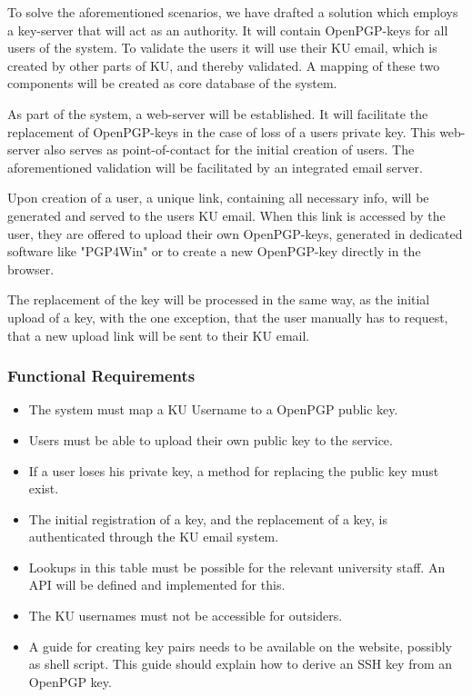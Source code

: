 \documentclass[11pt,a4paper]{report}
\begin{document}
To solve the aforementioned scenarios, we have drafted a solution which employs a key-server that will act as an authority. It will contain OpenPGP-keys for all users of the system. To validate the users it will use their KU email, which is created by other parts of KU, and thereby validated. A mapping of these two components will be created as core database of the system.

As part of the system, a web-server will be established. It will facilitate the replacement of OpenPGP-keys in the case of loss of a users private key. This web-server also serves as point-of-contact for the initial creation of users. The aforementioned validation will be facilitated by an integrated email server.

Upon creation of a user, a unique link, containing all necessary info, will be generated and served to the users KU email. When this link is accessed by the user, they are offered to upload their own OpenPGP-keys, generated in dedicated software like "PGP4Win" or to create a new OpenPGP-key directly in the browser.

The replacement of the key will be processed in the same way, as the initial upload of a key, with the one exception, that the user manually has to request, that a new upload link will be sent to their KU email.


\subsubsection{Functional Requirements}\label{Functional_Requirements}
\begin{itemize}
\item The system must map a KU Username to a OpenPGP public key.
\item Users must be able to upload their own public key to the service.
\item If a user loses his private key, a method for replacing the public key must exist.
\item The initial registration of a key, and the replacement of a key, is authenticated through the KU email system.
\item Lookups in this table must be possible for the relevant university staff. An API will be defined and implemented for this.
\item The KU usernames must not be accessible for outsiders.
\item A guide for creating key pairs needs to be available on the website, possibly as shell script. This guide should explain how to derive an SSH key from an OpenPGP key.
\end{itemize}
\end{document}
